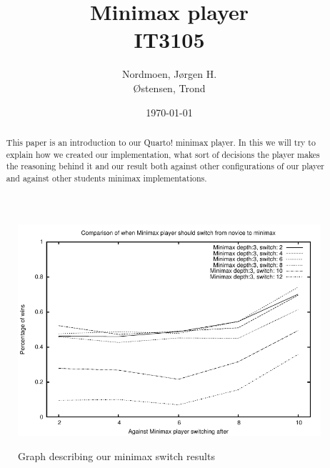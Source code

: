 \documentclass[titlepage, a4paper]{article}
\title{
	\quarto{} Minimax player \\
	IT3105 \\
}
\author{
	Nordmoen, Jørgen H. \\
	Østensen, Trond
}
\date{\today}
\newcommand{\quarto}{Quarto!}
\begin{document}
\maketitle

\begin{abstract}\label{abstract}
	This paper is an introduction to our \quarto{} minimax player. In this we will try to
	explain how we created our implementation, what sort of decisions the player makes
	the reasoning behind it and our result both against other configurations of our player
	and against other students minimax implementations.
\end{abstract}

\newpage
\tableofcontents













\begin{figure}[htb]
	\includegraphics{graphs/switch.pdf}
	\label{fig:minimax switch}
	\caption{Graph describing our minimax switch results}
\end{figure}
\end{document}
